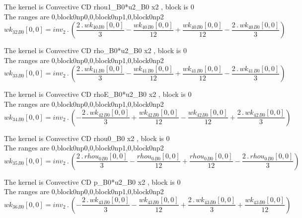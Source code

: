 \documentclass{article}
\begin{document}
\noindent The kernel is Convective CD rhou1_B0*u2_B0 x2 , block is 0\\\noindent The ranges are 0,block0np0,0,block0np1,0,block0np2\\\begin{dmath}{wk_{32}{_{B0}}}[{0,0}] = inv_2 \,.\, \left(\frac{2 \,.\, {wk_{40}{_{B0}}}[{0,0}]}{3} - \frac{{wk_{40}{_{B0}}}[{0,0}]}{12} + \frac{{wk_{40}{_{B0}}}[{0,0}]}{12} - \frac{2 \,.\, {wk_{40}{_{B0}}}[{0,0}]}{3}\right)\end{dmath}

\noindent The kernel is Convective CD rho_B0*u2_B0 x2 , block is 0\\\noindent The ranges are 0,block0np0,0,block0np1,0,block0np2\\\begin{dmath}{wk_{33}{_{B0}}}[{0,0}] = inv_2 \,.\, \left(\frac{2 \,.\, {wk_{41}{_{B0}}}[{0,0}]}{3} - \frac{{wk_{41}{_{B0}}}[{0,0}]}{12} + \frac{{wk_{41}{_{B0}}}[{0,0}]}{12} - \frac{2 \,.\, {wk_{41}{_{B0}}}[{0,0}]}{3}\right)\end{dmath}

\noindent The kernel is Convective CD rhoE_B0*u2_B0 x2 , block is 0\\\noindent The ranges are 0,block0np0,0,block0np1,0,block0np2\\\begin{dmath}{wk_{34}{_{B0}}}[{0,0}] = inv_2 \,.\, \left(- \frac{2 \,.\, {wk_{42}{_{B0}}}[{0,0}]}{3} + \frac{{wk_{42}{_{B0}}}[{0,0}]}{12} - \frac{{wk_{42}{_{B0}}}[{0,0}]}{12} + \frac{2 \,.\, {wk_{42}{_{B0}}}[{0,0}]}{3}\right)\end{dmath}

\noindent The kernel is Convective CD rhou0_B0 x2 , block is 0\\\noindent The ranges are 0,block0np0,0,block0np1,0,block0np2\\\begin{dmath}{wk_{35}{_{B0}}}[{0,0}] = inv_2 \,.\, \left(\frac{2 \,.\, {rhou_{0}{_{B0}}}[{0,0}]}{3} - \frac{{rhou_{0}{_{B0}}}[{0,0}]}{12} + \frac{{rhou_{0}{_{B0}}}[{0,0}]}{12} - \frac{2 \,.\, {rhou_{0}{_{B0}}}[{0,0}]}{3}\right)\end{dmath}

\noindent The kernel is Convective CD p_B0*u2_B0 x2 , block is 0\\\noindent The ranges are 0,block0np0,0,block0np1,0,block0np2\\\begin{dmath}{wk_{36}{_{B0}}}[{0,0}] = inv_2 \,.\, \left(- \frac{2 \,.\, {wk_{43}{_{B0}}}[{0,0}]}{3} - \frac{{wk_{43}{_{B0}}}[{0,0}]}{12} + \frac{2 \,.\, {wk_{43}{_{B0}}}[{0,0}]}{3} + \frac{{wk_{43}{_{B0}}}[{0,0}]}{12}\right)\end{dmath}
\end{document}

